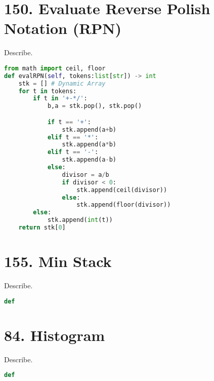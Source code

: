\documentclass{article}
\begin{document}
\section{150. Evaluate Reverse Polish Notation (RPN)}
\begin{tcolorbox}[colback=red!5!white, colframe=red!50!black,title=150. Evaluate Reverse Polish Notation (RPN) ] 
Describe.
\end{tcolorbox}
\begin{lstlisting}[language=Python]
from math import ceil, floor
def evalRPN(self, tokens:list[str]) -> int
    stk = [] # Dynamic Array
    for t in tokens:
        if t in '+-*/':
            b,a = stk.pop(), stk.pop()

            if t == '+':
                stk.append(a+b)
            elif t == '*':
                stk.append(a*b)
            elif t == '-':
                stk.append(a-b)
            else:
                divisor = a/b
                if divisor < 0:
                    stk.append(ceil(divisor))
                else:
                    stk.append(floor(divisor))
        else:
            stk.append(int(t))
    return stk[0]

\end{lstlisting}
\section{155. Min Stack}
\begin{tcolorbox}[colback=red!5!white, colframe=red!50!black,title=155. Min Stack ] 
Describe.
\end{tcolorbox}
\begin{lstlisting}[language=Python]
def 

\end{lstlisting}
\section{84. Histogram}
\begin{tcolorbox}[colback=red!5!white, colframe=red!50!black,title=84. Histogram ] 
Describe.
\end{tcolorbox}
\begin{lstlisting}[language=Python]
def 

\end{lstlisting}
\end{document}
